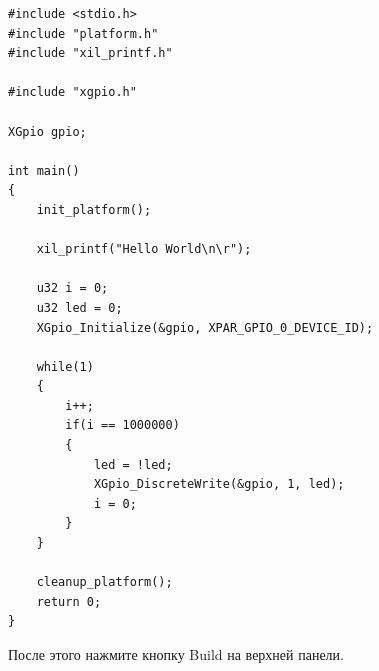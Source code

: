 \documentclass[a4paper,oneside ,10pt]{extreport}
\begin{document}
\begin{Verbatim}[tabsize=4]
#include <stdio.h>
#include "platform.h"
#include "xil_printf.h"

#include "xgpio.h"

XGpio gpio;

int main()
{
    init_platform();

    xil_printf("Hello World\n\r");

    u32 i = 0;
    u32 led = 0;
    XGpio_Initialize(&gpio, XPAR_GPIO_0_DEVICE_ID);

    while(1)
    {
    	i++;
    	if(i == 1000000)
    	{
    		led = !led;
    		XGpio_DiscreteWrite(&gpio, 1, led);
       		i = 0;
    	}
    }

    cleanup_platform();
    return 0;
}
\end{Verbatim}

После этого нажмите кнопку Build на верхней панели. 
\end{document}
